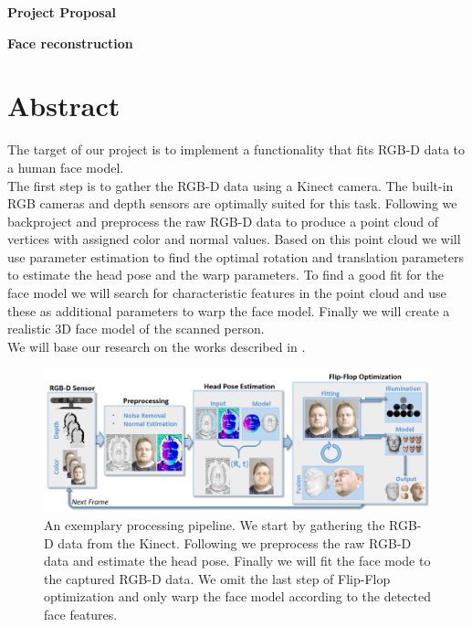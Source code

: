 \documentclass[a4paper,pagesize 10pt]{scrartcl}
\begin{document}
\begin{center}{\Huge\textbf{Project Proposal}}\end{center}
\begin{center}{\Large\textbf{Face reconstruction}}\end{center}

\section{Abstract}
The target of our project is to implement a functionality that fits RGB-D data to a human face model.\\
The first step is to gather the RGB-D data using a Kinect camera. The built-in RGB cameras and depth sensors are optimally suited for this task.
Following we backproject and preprocess the raw RGB-D data to produce a point cloud of vertices with assigned color and normal values. 
Based on this point cloud we will use parameter estimation to find the optimal rotation and translation parameters to estimate the head pose and the warp parameters. 
To find a good fit for the face model we will search for characteristic features in the point cloud and use these as additional parameters to warp the face model.
Finally we will create a realistic 3D face model of the scanned person.\\
We will base our research on the works described in \cite{Bondi2015, Shin2017, Turban2015,Zhang2016,Zollhofer2014}.

\begin{figure}[h]
	\centering
	\includegraphics[width=\linewidth]{Images/pipeline.png}
	\caption{An exemplary processing pipeline. We start by gathering the RGB-D data from the Kinect. Following we preprocess the raw RGB-D data and estimate the head pose. Finally we will fit the face mode to the captured RGB-D data.
	We omit the last step of Flip-Flop optimization and only warp the face model according to the detected face features.}
	\label{fig:overview}
\end{figure}
\end{document}
